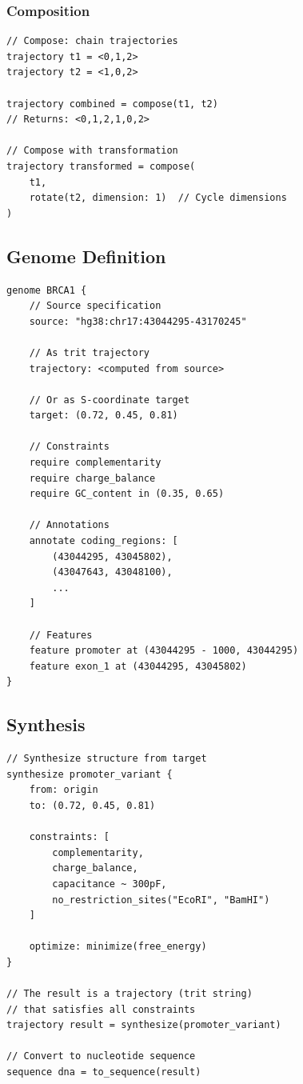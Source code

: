 \documentclass[twocolumn,10pt]{article}
\theoremstyle{remark}
\begin{document}
\subsubsection{Composition}
\begin{lstlisting}[style=tritcode]
// Compose: chain trajectories
trajectory t1 = <0,1,2>
trajectory t2 = <1,0,2>

trajectory combined = compose(t1, t2)
// Returns: <0,1,2,1,0,2>

// Compose with transformation
trajectory transformed = compose(
    t1,
    rotate(t2, dimension: 1)  // Cycle dimensions
)
\end{lstlisting}

\subsection{Genome Definition}

\begin{lstlisting}[style=tritcode]
genome BRCA1 {
    // Source specification
    source: "hg38:chr17:43044295-43170245"

    // As trit trajectory
    trajectory: <computed from source>

    // Or as S-coordinate target
    target: (0.72, 0.45, 0.81)

    // Constraints
    require complementarity
    require charge_balance
    require GC_content in (0.35, 0.65)

    // Annotations
    annotate coding_regions: [
        (43044295, 43045802),
        (43047643, 43048100),
        ...
    ]

    // Features
    feature promoter at (43044295 - 1000, 43044295)
    feature exon_1 at (43044295, 43045802)
}
\end{lstlisting}

\subsection{Synthesis}

\begin{lstlisting}[style=tritcode]
// Synthesize structure from target
synthesize promoter_variant {
    from: origin
    to: (0.72, 0.45, 0.81)

    constraints: [
        complementarity,
        charge_balance,
        capacitance ~ 300pF,
        no_restriction_sites("EcoRI", "BamHI")
    ]

    optimize: minimize(free_energy)
}

// The result is a trajectory (trit string)
// that satisfies all constraints
trajectory result = synthesize(promoter_variant)

// Convert to nucleotide sequence
sequence dna = to_sequence(result)
\end{lstlisting}
\end{document}
